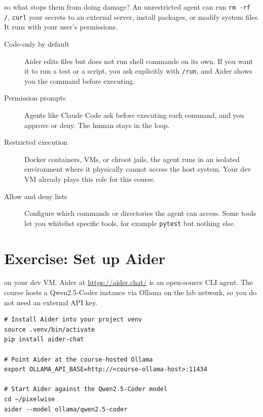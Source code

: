  so what stops them from doing damage? An unrestricted
agent can run \texttt{rm -rf /}, \texttt{curl} your secrets to an external server, install packages,
or modify system files. It runs with your user's permissions.


\begin{description}
    \item[Code-only by default] Aider edits files but does not run shell commands on its own. If you
    want it to run a test or a script, you ask explicitly with \texttt{/run}, and Aider shows you the
    command before executing.
    \item[Permission prompts] Agents like Claude Code ask before executing each command, and you
    approve or deny. The human stays in the loop.
    \item[Restricted execution] Docker containers, VMs, or chroot jails, the agent runs in an
    isolated environment where it physically cannot access the host system. Your dev VM already
    plays this role for this course.
    \item[Allow and deny lists] Configure which commands or directories the agent can access. Some
    tools let you whitelist specific tools, for example \texttt{pytest} but nothing else.
\end{description}


\newpage
\section{Exercise: Set up Aider}

 on your dev VM. Aider at \url{https://aider.chat/} is an
open-source CLI agent. The course hosts a Qwen2.5-Coder instance via
Ollama on the lab network, so you do not need an external API key.

\begin{verbatim}
# Install Aider into your project venv
source .venv/bin/activate
pip install aider-chat

# Point Aider at the course-hosted Ollama
export OLLAMA_API_BASE=http://<course-ollama-host>:11434

# Start Aider against the Qwen2.5-Coder model
cd ~/pixelwise
aider --model ollama/qwen2.5-coder
\end{verbatim}

